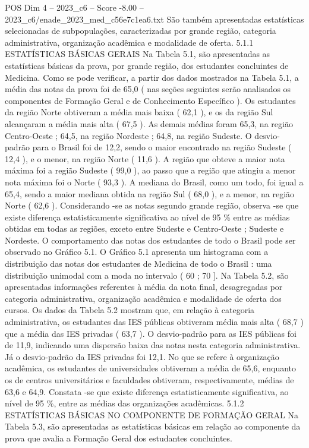 \begin{textsample}{POS Dim 4 – 2023\_c6 – Score -8.00 – 2023\_c6/enade\_2023\_med\_c56e7c1ea6.txt}
São também apresentadas estatísticas selecionadas de subpopulações, caracterizadas por grande região, categoria administrativa, organização acadêmica e modalidade de oferta. 5.1.1 ESTATÍSTICAS BÁSICAS GERAIS Na Tabela 5.1, são apresentadas as estatísticas básicas da prova, por grande região, dos estudantes concluintes de Medicina.
Como se pode verificar, a partir dos dados mostrados na Tabela 5.1, a média das notas da prova foi de 65,0 ( nas seções seguintes serão analisados os componentes de Formação Geral e de Conhecimento Específico ).
Os estudantes da região Norte obtiveram a média mais baixa ( 62,1 ), e os da região Sul alcançaram a média mais alta ( 67,5 ).
As demais médias foram 65,3, na região Centro-Oeste ; 64,5, na região Nordeste ; 64,8, na região Sudeste.
O desvio-padrão para o Brasil foi de 12,2, sendo o maior encontrado na região Sudeste ( 12,4 ), e o menor, na região Norte ( 11,6 ).
A região que obteve a maior nota máxima foi a região Sudeste ( 99,0 ), ao passo que a região que atingiu a menor nota máxima foi o Norte ( 93,3 ).
A mediana do Brasil, como um todo, foi igual a 65,4, sendo a maior mediana obtida na região Sul ( 68,0 ), e a menor, na região Norte ( 62,6 ).
Considerando -se as notas segundo grande região, observa -se que existe diferença estatisticamente significativa ao nível de 95 \% entre as médias obtidas em todas as regiões, exceto entre Sudeste e Centro-Oeste ; Sudeste e Nordeste.
O comportamento das notas dos estudantes de todo o Brasil pode ser observado no Gráfico 5.1.
O Gráfico 5.1 apresenta um histograma com a distribuição das notas dos estudantes de Medicina de todo o Brasil : uma distribuição unimodal com a moda no intervalo ( 60 ; 70 ].
Na Tabela 5.2, são apresentadas informações referentes à média da nota final, desagregadas por categoria administrativa, organização acadêmica e modalidade de oferta dos cursos.
Os dados da Tabela 5.2 mostram que, em relação à categoria administrativa, os estudantes das IES públicas obtiveram média mais alta ( 68,7 ) que a média das IES privadas ( 63,7 ).
O desvio-padrão para as IES públicas foi de 11,9, indicando uma dispersão baixa das notas nesta categoria administrativa.
Já o desvio-padrão da IES privadas foi 12,1.
No que se refere à organização acadêmica, os estudantes de universidades obtiveram a média de 65,6, enquanto os de centros universitários e faculdades obtiveram, respectivamente, médias de 63,6 e 64,9.
Constata -se que existe diferença estatisticamente significativa, ao nível de 95 \%, entre as médias das organizações acadêmicas. 5.1.2 ESTATÍSTICAS BÁSICAS NO COMPONENTE DE FORMAÇÃO GERAL Na Tabela 5.3, são apresentadas as estatísticas básicas em relação ao componente da prova que avalia a Formação Geral dos estudantes concluintes.

\end{textsample}
